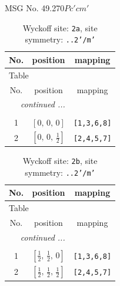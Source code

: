 \documentclass[fleqn,8pt]{jsarticle}
\begin{document}
\setcounter{MaxMatrixCols}{32}

\renewcommand{\tablename}{Table~}
\renewcommand{\figurename}{Figure~}
\begin{center}
\LARGE
MSG No. 49.270\quad$Pc'cm'$
\end{center}
\renewcommand{\arraystretch}{1.2}
\begin{longtable}{ccc}
\caption{Wyckoff site: {\tt 2a}, site symmetry: {\tt ..2'/m'}}
 \\
 \hline \hline
No. & position & mapping \\ \hline \endfirsthead

\multicolumn{2}{l}{\tablename\ \thetable{}} \\
 \hline \hline
No. & position & mapping \\ \hline \endhead

 \hline \hline
\multicolumn{2}{r}{\footnotesize\it continued ...} \\ \endfoot

 \hline \hline
\multicolumn{2}{r}{} \\ \endlastfoot

1 & $\left[ 0,\, 0,\, 0 \right]$ & {\tt [1,3,6,8]} \\ \hline
2 & $\left[ 0,\, 0,\, \frac{1}{2} \right]$ & {\tt [2,4,5,7]} \\
\end{longtable}
\renewcommand{\arraystretch}{1.2}
\begin{longtable}{ccc}
\caption{Wyckoff site: {\tt 2b}, site symmetry: {\tt ..2'/m'}}
 \\
 \hline \hline
No. & position & mapping \\ \hline \endfirsthead

\multicolumn{2}{l}{\tablename\ \thetable{}} \\
 \hline \hline
No. & position & mapping \\ \hline \endhead

 \hline \hline
\multicolumn{2}{r}{\footnotesize\it continued ...} \\ \endfoot

 \hline \hline
\multicolumn{2}{r}{} \\ \endlastfoot

1 & $\left[ \frac{1}{2},\, \frac{1}{2},\, 0 \right]$ & {\tt [1,3,6,8]} \\ \hline
2 & $\left[ \frac{1}{2},\, \frac{1}{2},\, \frac{1}{2} \right]$ & {\tt [2,4,5,7]} \\
\end{longtable}
\end{document}

